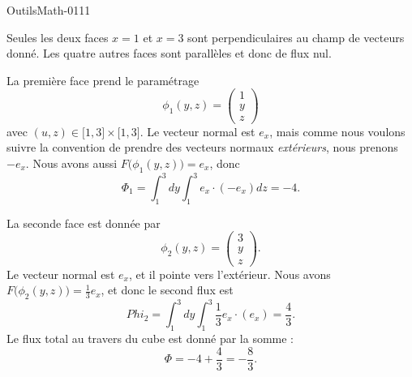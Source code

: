 
\begin{corrige}{OutilsMath-0111}

    Seules les deux faces $x=1$ et $x=3$ sont perpendiculaires au champ de vecteurs donné. Les quatre autres faces sont parallèles et donc de flux nul.

    La première face prend le paramétrage
    \begin{equation}
        \phi_1(y,z)=\begin{pmatrix}
            1    \\ 
            y    \\ 
            z    
        \end{pmatrix}
    \end{equation}
    avec $(u,z)\in\mathopen[ 1 , 3 \mathclose]\times \mathopen[ 1 , 3 \mathclose]$. Le vecteur normal est $e_x$, mais comme nous voulons suivre la convention de prendre des vecteurs normaux \emph{extérieurs}, nous prenons $-e_x$.
    Nous avons aussi $F\big( \phi_1(y,z) \big)=e_x$, donc
    \begin{equation}
        \Phi_1=\int_1^3dy\int_1^3 e_x\cdot (-e_x)dz=-4.
    \end{equation}
    
    La seconde face est donnée par
    \begin{equation}
        \phi_2(y,z)=\begin{pmatrix}
            3    \\ 
            y    \\ 
            z    
        \end{pmatrix}.
    \end{equation}
    Le vecteur normal est $e_x$, et il pointe vers l'extérieur. Nous avons $F\big( \phi_2(y,z) \big)=\frac{1}{ 3 }e_x$, et donc le second flux est
    \begin{equation}
        Phi_2=\int_1^3dy\int_1^3\frac{1}{ 3 }e_x\cdot (e_x)=\frac{ 4 }{ 3 }.
    \end{equation}
    Le flux total au travers du cube est donné par la somme :
    \begin{equation}
        \Phi=-4+\frac{ 4 }{ 3 }=-\frac{ 8 }{ 3 }.
    \end{equation}

\end{corrige}

